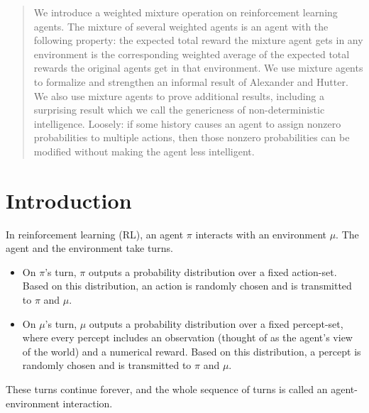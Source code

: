 \documentclass[twoside]{article}
\begin{document}
\twocolumn[

\aistatstitle{Agent Mixtures and the Genericness of Non-deterministic Intelligence}
\aistatsauthor{Samuel Allen Alexander \& David Quarrel \& Len Du \& Marcus Hutter}


]

\begin{abstract}
    We introduce a weighted mixture operation on
    reinforcement learning agents. The mixture of several weighted agents is
    an agent with the
    following property: the expected total reward the mixture agent
    gets in any environment is the corresponding weighted average
    of the expected total rewards the original agents get in that
    environment. We use mixture agents to formalize and
    strengthen an informal result of Alexander and Hutter. We also use mixture
    agents to prove additional results, including a surprising result
    which we call the genericness of non-deterministic intelligence. Loosely:
    if some history causes an agent to assign nonzero probabilities to multiple
    actions, then those nonzero probabilities can be modified without making
    the agent less intelligent.
\end{abstract}

\section{Introduction}

In reinforcement learning (RL), an agent $\pi$ interacts with an environment $\mu$.
The agent and the environment take turns.
\begin{itemize}
\item
On $\pi$'s turn, $\pi$
outputs a probability distribution over a fixed action-set.
Based on this distribution, an action is randomly chosen
and is transmitted to $\pi$ and $\mu$.
\item
On $\mu$'s turn, $\mu$
outputs a probability distribution over a fixed percept-set,
where every percept includes an observation (thought of as
the agent's view of the world) and a numerical reward.
Based on this distribution, a percept is randomly chosen and
is transmitted to $\pi$ and $\mu$.
\end{itemize}
These turns continue forever, and the whole sequence of turns
is called an agent-environment interaction.
\end{document}
